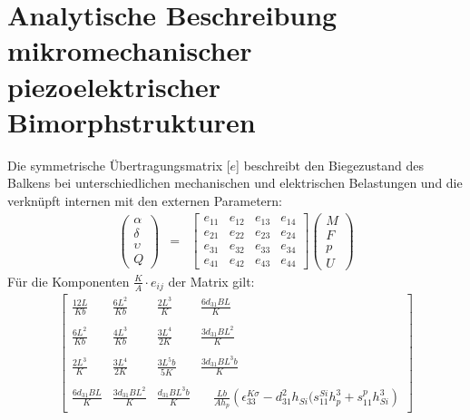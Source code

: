
\section[Aktoren]
{Analytische Beschreibung mikromechanischer piezoelektrischer Bimorphstrukturen}


Die symmetrische Übertragungsmatrix [$e$] beschreibt den Biegezustand
des Balkens bei unterschiedlichen mechanischen und elektrischen
Belastungen und die verknüpft internen mit den externen Parametern:
%
\begin{eqnarray*}
  \left(
  \begin{array}{c}
  \alpha \\ \delta \\ \upsilon \\ Q
  \end{array} \right) & = &
  \left[
  \begin{array}{llll}
  e_{11} & e_{12} & e_{13} & e_{14} \\
  e_{21} & e_{22} & e_{23} & e_{24} \\
  e_{31} & e_{32} & e_{33} & e_{34} \\
  e_{41} & e_{42} & e_{43} & e_{44}
  \end{array}
 \right]
 \left(
 \begin{array}{c}
 M \\ F \\ p \\ U
 \end{array}
\right)
\end{eqnarray*}
%
Für die Komponenten $\displaystyle \frac{K}{A} \cdot e_{ij}$ der Matrix gilt:
%
\begin{eqnarray*}
\left [
\begin{array}{cccc}
\displaystyle \frac{12L}{Kb} & \displaystyle \frac{6L^{2}}{Kb} &
\displaystyle \frac{2L^{3}}{K} & \frac{6d_{31}BL}{K} \\
\\
\displaystyle \frac{6L^{2}}{Kb} & \displaystyle \frac{4L^{3}}{Kb} &
\displaystyle \frac{3L^{4}}{2K} &
               \displaystyle \frac{3d_{31}BL^{2}}{K}\\
\\
\displaystyle \frac{2L^{3}}{K} & \displaystyle \frac{3L^{4}}{2K} &
\displaystyle \frac{3L^{5}b}{5K} & \displaystyle
\frac{3d_{31}BL^{3}b}{K}\\
\\
\displaystyle \frac{6d_{31}BL}{K}     &
\displaystyle \frac{3d_{31}BL^{2}}{K} &
\displaystyle \frac{d_{31}BL^{3}b}{K} &
\quad \displaystyle \frac{Lb}{Ah_{p}} %
\left( \epsilon^{K \sigma}_{33} -
d_{31}^{2} h_{Si} (s^{Si}_{11} h_{p}^{3} +
s^{p}_{11} h_{Si}^{3}  \right)
\end{array}
\right ]
\end{eqnarray*}
